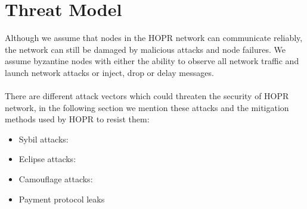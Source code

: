 \section{Threat Model}
Although we assume that nodes in the HOPR network can communicate reliably, the network can still be damaged by malicious attacks and node failures. We assume byzantine nodes with either the ability to observe all network traffic and launch network attacks or inject, drop or delay messages. 
\\~\\There are different attack vectors which could threaten the security of HOPR network, in the following section we mention these attacks and the mitigation methods used by HOPR to resist them:
\begin{itemize}
    \item Sybil attacks: 
   \item Eclipse attacks:
   \item Camouflage attacks:
   \item Payment protocol leaks
   
   
\end{itemize}